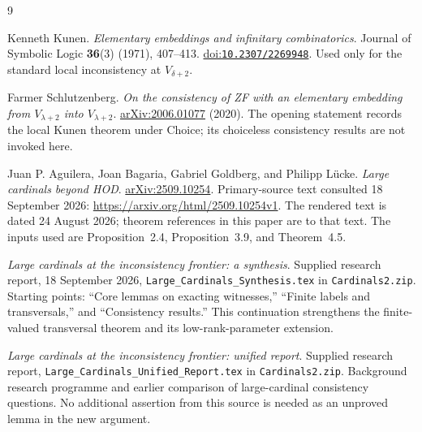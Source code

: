 \documentclass[11pt,letterpaper]{article}
\theoremstyle{definition}
\numberwithin{equation}{section}
\newcommand{\arxiv}[1]{\href{https://arxiv.org/abs/#1}{arXiv:#1}}
\newcommand{\doi}[1]{\href{https://doi.org/#1}{doi:\nolinkurl{#1}}}
\begin{document}
\newpage
\begin{thebibliography}{9}

Kenneth Kunen.
\emph{Elementary embeddings and infinitary combinatorics}.
Journal of Symbolic Logic \textbf{36}(3) (1971), 407--413.
\doi{10.2307/2269948}.
Used only for the standard local inconsistency at $V_{\delta+2}$.

Farmer Schlutzenberg.
\emph{On the consistency of ZF with an elementary embedding from
$V_{\lambda+2}$ into $V_{\lambda+2}$}.
\arxiv{2006.01077} (2020).
The opening statement records the local Kunen theorem under Choice;
its choiceless consistency results are not invoked here.

Juan P. Aguilera, Joan Bagaria, Gabriel Goldberg, and Philipp L\"ucke.
\emph{Large cardinals beyond HOD}.
\arxiv{2509.10254}.
Primary-source text consulted 18 September 2026:
\url{https://arxiv.org/html/2509.10254v1}.
The rendered text is dated 24 August 2026; theorem references in this
paper are to that text. The inputs used are Proposition~2.4,
Proposition~3.9, and Theorem~4.5.

\emph{Large cardinals at the inconsistency frontier: a synthesis}.
Supplied research report, 18 September 2026,
\nolinkurl{Large_Cardinals_Synthesis.tex} in \nolinkurl{Cardinals2.zip}.
Starting points: ``Core lemmas on exacting witnesses,''
``Finite labels and transversals,'' and ``Consistency results.''
This continuation strengthens the finite-valued transversal theorem
and its low-rank-parameter extension.

\emph{Large cardinals at the inconsistency frontier: unified report}.
Supplied research report,
\nolinkurl{Large_Cardinals_Unified_Report.tex} in
\nolinkurl{Cardinals2.zip}.
Background research programme and earlier comparison of large-cardinal
consistency questions. No additional assertion from this source is
needed as an unproved lemma in the new argument.

\end{thebibliography}
\end{document}
